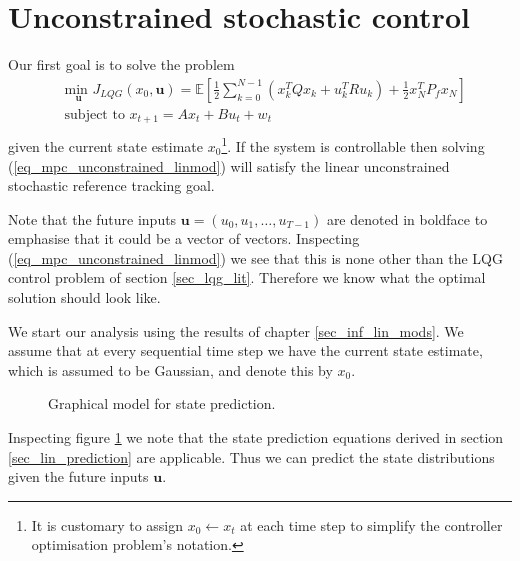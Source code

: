 \section{Unconstrained stochastic control}
\label{sec_uncon_lin_control}
Our first goal is to solve the problem 
\begin{equation}
\begin{aligned}
&\underset{\mathbf{u}}{\text{min }} J_{LQG}(x_0, \mathbf{u}) = \mathbb{E}\left[ \frac{1}{2}\sum_{k=0}^{N-1} \left( x_k^TQx_k + u_k^TRu_k \right) + \frac{1}{2}x_N^TP_fx_N \right] \\
& \text{subject to } x_{t+1}=Ax_t+Bu_t + w_t\\
\end{aligned}
\label{eq_mpc_unconstrained_linmod}
\end{equation}
given the current state estimate $x_0$\footnote{It is customary to assign $x_0 \leftarrow x_t$ at each time step to simplify the controller optimisation problem's notation.}. If the system is controllable then solving (\ref{eq_mpc_unconstrained_linmod}) will satisfy the linear unconstrained stochastic reference tracking goal.

Note that the future inputs $\mathbf{u}=(u_0, u_1,\hdots,u_{T-1})$ are denoted in boldface to emphasise that it could be a vector of vectors. Inspecting (\ref{eq_mpc_unconstrained_linmod}) we see that this is none other than the LQG control problem of section \ref{sec_lqg_lit}. Therefore we know what the optimal solution should look like.

We start our analysis using the results of chapter \ref{sec_inf_lin_mods}. We assume that at every sequential time step we have the current state estimate, which is assumed to be Gaussian, and denote this by $x_0$. 
\begin{figure}[H] 
\centering
{}
\caption{Graphical model for state prediction.}
\label{fig_gm_mpc}
\end{figure}
Inspecting figure \ref{fig_gm_mpc} we note that the state prediction equations derived in section \ref{sec_lin_prediction} are applicable. Thus we can predict the state distributions given the future inputs $\mathbf{u}$.

